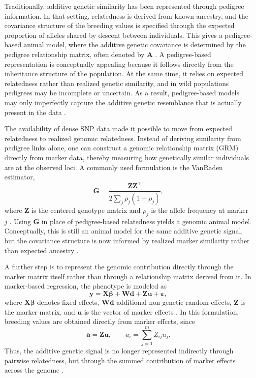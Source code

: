 Traditionally, additive genetic similarity has been represented through pedigree information. In that setting, relatedness is derived from known ancestry, and the covariance structure of the breeding values is specified through the expected proportion of alleles shared by descent between individuals. %
This gives a pedigree-based animal model, where the additive genetic covariance is determined by the pedigree relationship matrix, often denoted by $\mathbf{A}$ \parencite{kruuk_estimating_2004, lynch_genetics_1998}. %
A pedigree-based representation is conceptually appealing because it follows directly from the inheritance structure of the population. At the same time, it relies on expected relatedness rather than realized genetic similarity, and in wild populations pedigrees may be incomplete or uncertain. %
As a result, pedigree-based models may only imperfectly capture the additive genetic resemblance that is actually present in the data \parencite{ashraf_genomic_2022}. %

The availability of dense SNP data made it possible to move from expected relatedness to realized genomic relatedness. Instead of deriving similarity from pedigree links alone, one can construct a genomic relationship matrix (GRM) directly from marker data, thereby measuring how genetically similar individuals are at the observed loci. %
A commonly used formulation is the VanRaden estimator,
\begin{equation}
\mathbf{G} = \frac{\mathbf{Z}\mathbf{Z}^{\top}}{2\sum_j \rho_j(1-\rho_j)},
\label{eq:VanRanden_est}
\end{equation}
where $\mathbf{Z}$ is the centered genotype matrix and $\rho_j$ is the allele frequency at marker $j$ \parencite{vanraden_efficient_2008}. %
Using $\mathbf{G}$ in place of pedigree-based relatedness yields a genomic animal model. Conceptually, this is still an animal model for the same additive genetic signal, but the covariance structure is now informed by realized marker similarity rather than expected ancestry \parencite{ashraf_genomic_2022, vanraden_efficient_2008}. %

A further step is to represent the genomic contribution directly through the marker matrix itself rather than through a relationship matrix derived from it. In marker-based regression, the phenotype is modeled as
\[
\mathbf{y} = \mathbf{X}\boldsymbol{\beta} + \mathbf{W}\mathbf{d} + \mathbf{Z}\mathbf{u} + \boldsymbol{\varepsilon},
\]
where $\mathbf{X}\boldsymbol{\beta}$ denotes fixed effects, $\mathbf{W}\mathbf{d}$ additional non-genetic random effects, $\mathbf{Z}$ is the marker matrix, and $\mathbf{u}$ is the vector of marker effects \parencite{meuwissen_prediction_2001, aspheim_bayesian_2024}. %
In this formulation, breeding values are obtained directly from marker effects, since
\[
\mathbf{a} = \mathbf{Z}\mathbf{u},
\qquad
a_i = \sum_{j=1}^m Z_{ij}u_j .
\]
Thus, the additive genetic signal is no longer represented indirectly through pairwise relatedness, but through the summed contribution of marker effects across the genome \parencite{meuwissen_prediction_2001, aspheim_bayesian_2024}. %


